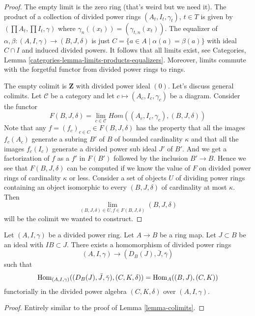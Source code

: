 \begin{proof}
The empty limit is the zero ring (that's weird but we need it).
The product of a collection of divided power rings $(A_t, I_t, \gamma_t)$,
$t \in T$ is given by $(\prod A_t, \prod I_t, \gamma)$ where
$\gamma_n((x_t)) = (\gamma_{t, n}(x_t))$.
The equalizer of $\alpha, \beta : (A, I, \gamma) \to (B, J, \delta)$
is just $C = \{a \in A \mid \alpha(a) = \beta(a)\}$ with ideal $C \cap I$
and induced divided powers. It follows that all limits exist, see
Categories, Lemma \ref{categories-lemma-limits-products-equalizers}.
Moreover, limits commute with the forgetful functor from divided
power rings to rings.

\medskip\noindent
The empty colimit is $\mathbf{Z}$ with divided power ideal $(0)$.
Let's discuss general colimits. Let $\mathcal{C}$ be a category and let
$c \mapsto (A_c, I_c, \gamma_c)$ be a diagram. Consider the functor
$$
F(B, J, \delta) = \lim_{c \in \mathcal{C}}
Hom((A_c, I_c, \gamma_c), (B, J, \delta))
$$
Note that any $f = (f_c)_{c \in C} \in F(B, J, \delta)$ has the property
that all the images $f_c(A_c)$ generate a subring $B'$ of $B$ of bounded
cardinality $\kappa$ and that all the images $f_c(I_c)$ generate a
divided power sub ideal $J'$ of $B'$. And we get a factorization of
$f$ as a $f'$ in $F(B')$ followed by the inclusion $B' \to B$.
Hence we see that $F(B, J, \delta)$ can be computed if we know the value
of $F$ on divided power rings of
cardinality $\kappa$ or less. Consider a set of objects $U$ of
dividing power rings containing an object isomorphic to every
$(B, J, \delta)$ of cardinality
at most $\kappa$. Then
$$
\lim_{(B, J, \delta) \in U, f \in F(B, J, \delta)} (B, J, \delta)
$$
will be the colimit we wanted to construct.
\end{proof}

\begin{lemma}
\label{lemma-divided-power-envelope}
Let $(A, I, \gamma)$ be a divided power ring.
Let $A \to B$ be a ring map. Let $J \subset B$ be an ideal
with $IB \subset J$. There exists a homomorphism of
divided power rings
$$
(A, I, \gamma) \longrightarrow (D_B(J), \bar J, \bar \gamma)
$$
such that
$$
\mathop{\rm Hom}\nolimits_{(A, I, \gamma)}((D_B(J), \bar J, \bar \gamma), (C, K, \delta))
=
\mathop{\rm Hom}\nolimits_A((B, J), (C, K))
$$
functorially in the divided power algebra $(C, K, \delta)$ over
$(A, I, \gamma)$.
\end{lemma}

\begin{proof}
Entirely similar to the proof of Lemma \ref{lemma-colimits}.
\end{proof}

